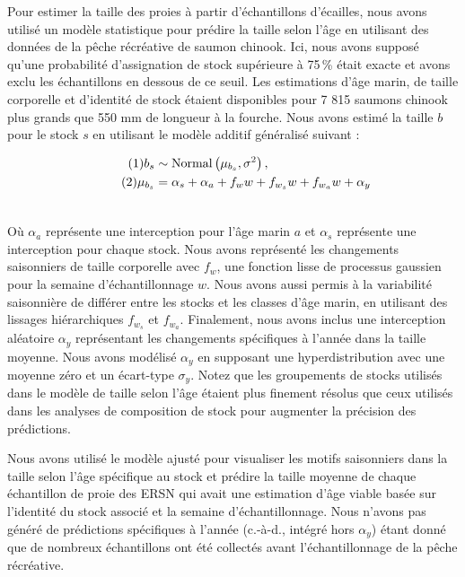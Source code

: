 
Pour estimer la taille des proies à partir d'échantillons d'écailles, nous avons utilisé un modèle statistique pour prédire la taille selon l'âge en utilisant des données de la pêche récréative de saumon chinook. Ici, nous avons supposé qu'une probabilité d'assignation de stock supérieure à 75\,\% était exacte et avons exclu les échantillons en dessous de ce seuil. Les estimations d'âge marin, de taille corporelle et d'identité de stock étaient disponibles pour 7 815 saumons chinook plus grands que 550 mm de longueur à la fourche. Nous avons estimé la taille $b$ pour le stock $s$ en utilisant le modèle additif généralisé suivant :

\begin{align}
\label{eq:size_eq}
\tag{1}
b_{s} &\sim \operatorname{Normal} \left( \mu_{b_s}, \sigma^2 \right),\\
\tag{2}
\mu_{b_s} &= \alpha_s + \alpha_a + f_{w}w + f_{w_{s}}w + f_{w_{a}}w + \alpha_y \\
\notag
\end{align}
\noindent

Où $\alpha_a$ représente une interception pour l'âge marin $a$ et $\alpha_s$ représente une interception pour chaque stock. Nous avons représenté les changements saisonniers de taille corporelle avec $f_{w}$, une fonction lisse de processus gaussien pour la semaine d'échantillonnage $w$. Nous avons aussi permis à la variabilité saisonnière de différer entre les stocks et les classes d'âge marin, en utilisant des lissages hiérarchiques $f_{w_s}$ et $f_{w_a}$. Finalement, nous avons inclus une interception aléatoire $\alpha_y$ représentant les changements spécifiques à l'année dans la taille moyenne. Nous avons modélisé $\alpha_y$ en supposant une hyperdistribution avec une moyenne zéro et un écart-type $\sigma_y$. Notez que les groupements de stocks utilisés dans le modèle de taille selon l'âge étaient plus finement résolus que ceux utilisés dans les analyses de composition de stock pour augmenter la précision des prédictions.

Nous avons utilisé le modèle ajusté pour visualiser les motifs saisonniers dans la taille selon l'âge spécifique au stock et prédire la taille moyenne de chaque échantillon de proie des ERSN qui avait une estimation d'âge viable basée sur l'identité du stock associé et la semaine d'échantillonnage. Nous n'avons pas généré de prédictions spécifiques à l'année (c.-à-d., intégré hors $\alpha_y$) étant donné que de nombreux échantillons ont été collectés avant l'échantillonnage de la pêche récréative. 

